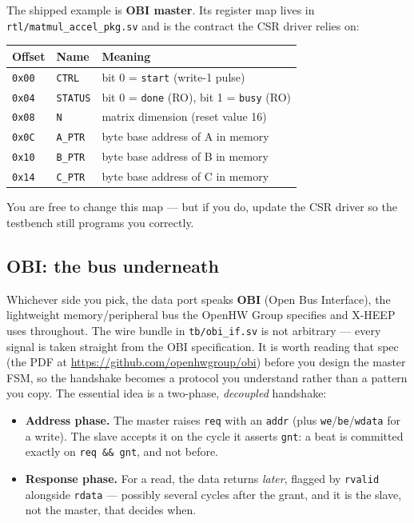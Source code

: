 \documentclass[11pt]{article}
\newcommand{\code}[1]{\texttt{#1}}
\begin{document}
The shipped example is \textbf{OBI master}. Its register map lives in
\code{rtl/matmul\_accel\_pkg.sv} and is the contract the CSR driver relies on:

\begin{center}
\small
\begin{tabular}{@{}llp{7.6cm}@{}}
\toprule
Offset & Name & Meaning \\
\midrule
\code{0x00} & \code{CTRL}   & bit 0 = \code{start} (write-1 pulse) \\
\code{0x04} & \code{STATUS} & bit 0 = \code{done} (RO), bit 1 = \code{busy} (RO) \\
\code{0x08} & \code{N}      & matrix dimension (reset value 16) \\
\code{0x0C} & \code{A\_PTR} & byte base address of A in memory \\
\code{0x10} & \code{B\_PTR} & byte base address of B in memory \\
\code{0x14} & \code{C\_PTR} & byte base address of C in memory \\
\bottomrule
\end{tabular}
\end{center}

You are free to change this map --- but if you do, update the CSR driver so the
testbench still programs you correctly.

\subsection{OBI: the bus underneath}

Whichever side you pick, the data port speaks \textbf{OBI} (Open Bus Interface),
the lightweight memory/peripheral bus the OpenHW Group specifies and X-HEEP uses
throughout. The wire bundle in \code{tb/obi\_if.sv} is not arbitrary --- every
signal is taken straight from the OBI specification. It is worth reading that
spec (the PDF at \url{https://github.com/openhwgroup/obi}) before you design the
master FSM, so the handshake becomes a protocol you understand rather than a
pattern you copy. The essential idea is a two-phase, \emph{decoupled} handshake:

\begin{itemize}[nosep]
  \item \textbf{Address phase.} The master raises \code{req} with an \code{addr}
        (plus \code{we}/\code{be}/\code{wdata} for a write). The slave accepts it
        on the cycle it asserts \code{gnt}: a beat is committed exactly on
        \code{req \&\& gnt}, and not before.
  \item \textbf{Response phase.} For a read, the data returns \emph{later},
        flagged by \code{rvalid} alongside \code{rdata} --- possibly several
        cycles after the grant, and it is the slave, not the master, that
        decides when.
\end{itemize}
\end{document}
